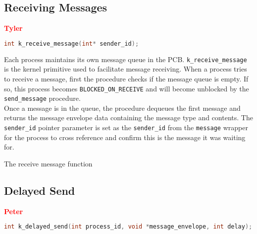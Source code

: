 \documentclass[12pt]{report}
\begin{document}
\subsection{Receiving Messages}

\textcolor{red}{\textbf{Tyler}} \\
\begin{minipage}{\textwidth}
\begin{lstlisting}[language=C, frame=single]
int k_receive_message(int* sender_id);
\end{lstlisting}
\end{minipage}

Each process maintains its own message queue in the PCB. {\tt k\_receive\_message} is the kernel primitive used to facilitate message receiving. When a process tries to receive a message, first the procedure checks if the message queue is empty. If so, this process becomes {\tt BLOCKED\_ON\_RECEIVE} and will become unblocked by the {\tt send\_message} procedure. \\

Once a message is in the queue, the procedure dequeues the first message and returns the message envelope data containing the message type and contents. The {\tt sender\_id} pointer parameter is set as the {\tt sender\_id} from the {\tt message} wrapper for the process to cross reference and confirm this is the message it was waiting for. \\

\begin{algorithm}
  \caption{The receive message function}
  \begin{algorithmic}[1]
		\EndWhile
    \EndProcedure
  \end{algorithmic}
\end{algorithm}

\subsection{Delayed Send}

\textcolor{red}{\textbf{Peter}} \\

\begin{minipage}{\textwidth}
\begin{lstlisting}[language=C, frame=single]
int k_delayed_send(int process_id, void *message_envelope, int delay);
\end{lstlisting}
\end{minipage}
\end{document}
